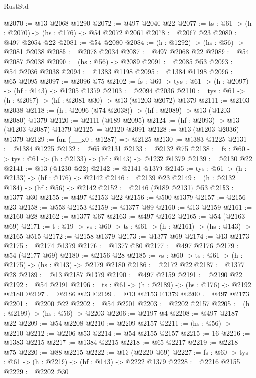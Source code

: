 \begin{lexlean}{RustStd}
\begin{coremodule}
@2070 := @13 @2068 @1290
@2072 := @497 @2040 @22
@2077 := {ts : @61} -> (h : @2070) -> (hs : @176) -> @54 @2072 @2061
@2078 := @2067 @23
@2080 := @497 @2054 @22
@2081 := @54 @2080
@2084 := (h : @1292) -> (hs : @56) -> @2081 @2038
@2085 := @2078 @2034
@2087 := @497 @2068 @22
@2089 := @54 @2087 @2038
@2090 := (hs : @56) -> @2089
@2091 := @2085 @53
@2093 := @54 @2036 @2038
@2094 := @1383 @1198
@2095 := @1384 @1198
@2096 := @65 @2095
@2097 := @2096 @75
@2102 := {fs : @60} -> {tys : @61} -> (h : @2097) -> (hf : @143) -> @1205 @1379
@2103 := @2094 @2036
@2110 := {tys : @61} -> (h : @2097) -> (hf : @2081 @30) -> @13 (@1203 @2072) @1379
@2111 := @2103 @2038
@2118 := (h : @2096 (@74 @2038)) -> (hf : @2089) -> @13 (@1203 @2080) @1379
@2120 := @2111 (@189 @2095)
@2124 := (hf : @2093) -> @13 (@1203 @2087) @1379
@2125 := @2120 @2091
@2128 := @13 (@1203 @2036) @1379
@2129 := fun (__x0 : @1287) => @2125
@2130 := @1383 @1225
@2131 := @1384 @1225
@2132 := @65 @2131
@2133 := @2132 @75
@2138 := {fs : @60} -> {tys : @61} -> (h : @2133) -> (hf : @143) -> @1232 @1379
@2139 := @2130 @22
@2141 := @13 (@1230 @22)
@2142 := @2141 @1379
@2145 := {tys : @61} -> (h : @2133) -> (hf : @176) -> @2142
@2146 := @2139 @23
@2149 := (h : @2132 @184) -> (hf : @56) -> @2142
@2152 := @2146 (@189 @2131) @53
@2153 := @1377 @30
@2155 := @497 @2153 @22
@2156 := @500 @1379
@2157 := @2156 @23
@2158 := @558 @2153
@2159 := @1377 @89
@2160 := @13 @2159
@2161 := @2160 @28
@2162 := @1377 @67
@2163 := @497 @2162
@2165 := @54 (@2163 @69)
@2171 := {t : @19} -> {vs : @60} -> {ts : @61} -> (h : @2161) -> (hs : @143) -> @2165 @515
@2172 := @2158 @1379
@2173 := @1377 @69
@2174 := @13 @2173
@2175 := @2174 @1379
@2176 := @1377 @80
@2177 := @497 @2176
@2179 := @54 (@2177 @69)
@2180 := @2156 @28
@2185 := {vs : @60} -> {ts : @61} -> (h : @2175) -> (hs : @143) -> @2179 @2180
@2186 := @2172 @22
@2187 := @1377 @28
@2189 := @13 @2187 @1379
@2190 := @497 @2159
@2191 := @2190 @22
@2192 := @54 @2191
@2196 := {ts : @61} -> (h : @2189) -> (hs : @176) -> @2192 @2180
@2197 := @2186 @23
@2199 := @13 @2153 @1379
@2200 := @497 @2173
@2201 := @2200 @22
@2202 := @54 @2201
@2203 := @2202 @2157
@2205 := (h : @2199) -> (hs : @56) -> @2203
@2206 := @2197 @4
@2208 := @497 @2187 @22
@2209 := @54 @2208
@2210 := @2209 @2157
@2211 := (hs : @56) -> @2210
@2212 := @2206 @53
@2214 := @54 @2155 @2157
@2215 := 16
@2216 := @1383 @2215
@2217 := @1384 @2215
@2218 := @65 @2217
@2219 := @2218 @75
@2220 := @88 @2215
@2222 := @13 (@2220 @69)
@2227 := {fs : @60} -> {tys : @61} -> (h : @2219) -> (hf : @143) -> @2222 @1379
@2228 := @2216 @2155
@2229 := @2202 @30

\end{coremodule}
\end{lexlean}
